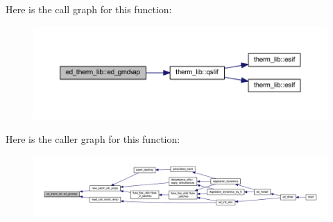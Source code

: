 Here is the call graph for this function\+:\nopagebreak
\begin{figure}[H]
\begin{center}
\leavevmode
\includegraphics[width=350pt]{namespaceed__therm__lib_ad7497e216325854214ab9dd57a26f6ee_cgraph}
\end{center}
\end{figure}




Here is the caller graph for this function\+:\nopagebreak
\begin{figure}[H]
\begin{center}
\leavevmode
\includegraphics[width=350pt]{namespaceed__therm__lib_ad7497e216325854214ab9dd57a26f6ee_icgraph}
\end{center}
\end{figure}


